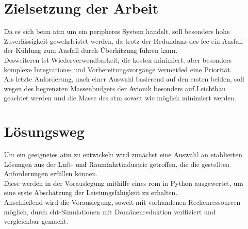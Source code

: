 \section{Zielsetzung der Arbeit}

Da es sich beim \ac{atm} um ein peripheres System handelt, soll besonders hohe Zuverlässigkeit gewehrleistet werden, da trotz der
Redundanz des \ac{fcc} ein Ausfall der Kühlung zum Ausfall durch Überhitzung führen kann.\\
Desweiteren ist Wiederverwendbarkeit, die kosten minimiert, aber besonders komplexe Integrations- und Vorbereitungsvorgänge
vermeided eine Priorität.\\
Als letzte Anforderung, nach einer Auswahl basierend auf den ersten beiden, soll wegen des begrenzten Massenbudgets der Avionik
besonders auf Leichtbau geachtet werden und die Masse des \ac{atm} soweit wie möglich minimiert werden.\\

\section{Lösungsweg}

Um ein geeignetes \ac{atm} zu entwickeln wird zunächst eine Auswahl an etablierten Lösungen aus der Luft- und Raumfahrtindustrie
getroffen, die die gestellten Anforderungen erfüllen können.\\

Diese werden in der Vorauslegung mithilfe eines \ac{rom} in Python ausgewertet, um eine erste Abschätzung der Leistungsfähigkeit zu erhalten.\\
Anschließend wird die Vorauslegung, soweit mit vorhandenen Rechenressourcen möglich, durch \ac{cht}-Simulationen mit Domänenreduktion
verifiziert und vergleichbar gemacht.